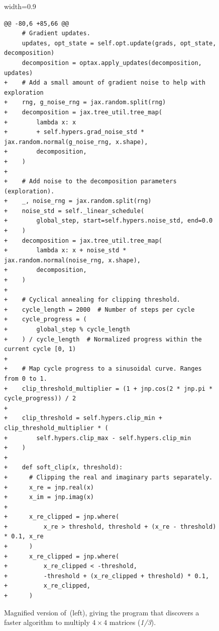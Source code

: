 \documentclass[logo,copyright,12pt]{googledeepmind}
\theoremstyle{definition}
\theoremstyle{remark}
\theoremstyle{plain}
\begin{document}
\begin{figure}[p]
\begin{adjustbox}{width=0.9\textwidth}
\begin{minipage}{0.9\textwidth}
\begin{lstlisting}[style=pydiff, backgroundcolor=\color{backcolour}]
@@ -80,6 +85,66 @@
     # Gradient updates.
     updates, opt_state = self.opt.update(grads, opt_state, decomposition)
     decomposition = optax.apply_updates(decomposition, updates)
+    # Add a small amount of gradient noise to help with exploration
+    rng, g_noise_rng = jax.random.split(rng)
+    decomposition = jax.tree_util.tree_map(
+        lambda x: x
+        + self.hypers.grad_noise_std * jax.random.normal(g_noise_rng, x.shape),
+        decomposition,
+    )
+
+    # Add noise to the decomposition parameters (exploration).
+    _, noise_rng = jax.random.split(rng)
+    noise_std = self._linear_schedule(
+        global_step, start=self.hypers.noise_std, end=0.0
+    )
+    decomposition = jax.tree_util.tree_map(
+        lambda x: x + noise_std * jax.random.normal(noise_rng, x.shape),
+        decomposition,
+    )
+
+    # Cyclical annealing for clipping threshold.
+    cycle_length = 2000  # Number of steps per cycle
+    cycle_progress = (
+        global_step % cycle_length
+    ) / cycle_length  # Normalized progress within the current cycle [0, 1)
+
+    # Map cycle progress to a sinusoidal curve. Ranges from 0 to 1.
+    clip_threshold_multiplier = (1 + jnp.cos(2 * jnp.pi * cycle_progress)) / 2
+
+    clip_threshold = self.hypers.clip_min + clip_threshold_multiplier * (
+        self.hypers.clip_max - self.hypers.clip_min
+    )
+
+    def soft_clip(x, threshold):
+      # Clipping the real and imaginary parts separately.
+      x_re = jnp.real(x)
+      x_im = jnp.imag(x)
+
+      x_re_clipped = jnp.where(
+          x_re > threshold, threshold + (x_re - threshold) * 0.1, x_re
+      )
+      x_re_clipped = jnp.where(
+          x_re_clipped < -threshold,
+          -threshold + (x_re_clipped + threshold) * 0.1,
+          x_re_clipped,
+      )
\end{lstlisting}
\end{minipage}
\end{adjustbox}
\caption{
Magnified version of~(left), giving the program that discovers a faster algorithm to multiply $4\times4$ matrices (\emph{1/3}).}\label{fig:relaxed-opt-diff-appendix-1}
\centering
\end{figure}
\addtocounter{figure}{-1}
\end{document}

